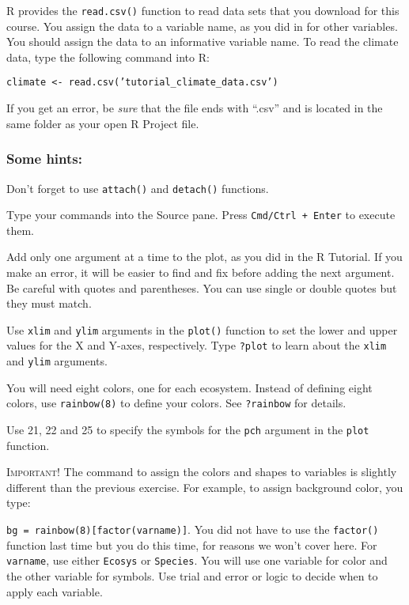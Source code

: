 \documentclass[11pt]{article}
\begin{document}
	R provides the \texttt{read.csv()} function to read data sets that you download for this course. You assign the data to a variable name, as you did in for other variables.
	You should assign the data to an informative variable name. To read the climate 
	data, type the following command into R:
	
	
	\texttt{climate \textless{}-
		read.csv('tutorial\_climate\_data.csv')}
	
	If you get an error, be \textit{sure} that the file ends with “.csv” and is located in the same folder as your open R Project file.
	
	\subsubsection*{Some hints:}
	
	Don't forget to use \texttt{attach()} and \texttt{detach()} functions.
	
	Type your commands into the Source pane. Press \texttt{Cmd/Ctrl + Enter} to execute them.
	
	Add only one argument at a time to the plot, as you
	did in the R Tutorial. If you make an error, it will be easier to find and fix
	before adding the next argument. Be careful with quotes and parentheses. You can use single or double quotes but they must match.
	
	Use \texttt{xlim} and \texttt{ylim} arguments in the \texttt{plot()} function to set the lower and
	upper values for the X and Y-axes, respectively. Type \texttt{?plot} to learn about
	the \texttt{xlim} and \texttt{ylim} arguments.
	
	
	You will need eight colors, one for each ecosystem. Instead of defining
	eight colors, use \texttt{rainbow(8)} to define your colors. See \texttt{?rainbow} for
	details.
	
	Use 21, 22 and 25 to specify the symbols for the \texttt{pch} argument in the
	\texttt{plot} function.
	
	\textsc{Important!} The command to assign the colors and shapes to variables is slightly different than the previous exercise. For example, to assign background color, you type:
	
	\texttt{bg = rainbow(8)[factor(varname)]}. You did not have to use the \texttt{factor()} function last time but you do this time, for reasons we won't cover here. For \texttt{varname}, use either \texttt{Ecosys} or \texttt{Species}. You will use one variable for color and the other variable for symbols. Use trial and error or logic to decide when to apply each variable. 
	
\end{document}
